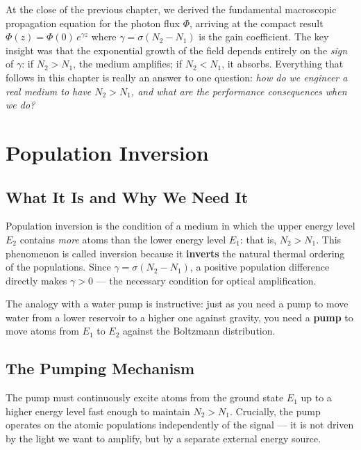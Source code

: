 
At the close of the previous chapter, we derived the fundamental macroscopic propagation equation for the photon flux $\Phi$, arriving at the compact result $\Phi(z) = \Phi(0)\,e^{\gamma z}$ where $\gamma = \sigma(N_2 - N_1)$ is the gain coefficient. The key insight was that the exponential growth of the field depends entirely on the \emph{sign} of $\gamma$: if $N_2 > N_1$, the medium amplifies; if $N_2 < N_1$, it absorbs. Everything that follows in this chapter is really an answer to one question: \emph{how do we engineer a real medium to have $N_2 > N_1$, and what are the performance consequences when we do?}

\section{Population Inversion}

\subsection{What It Is and Why We Need It}

Population inversion is the condition of a medium in which the upper energy level $E_2$ contains \emph{more} atoms than the lower energy level $E_1$: that is, $N_2 > N_1$. This phenomenon is called inversion because it \textbf{inverts} the natural thermal ordering of the populations. Since $\gamma = \sigma(N_2 - N_1)$, a positive population difference directly makes $\gamma > 0$ — the necessary condition for optical amplification.

The analogy with a water pump is instructive: just as you need a pump to move water from a lower reservoir to a higher one against gravity, you need a \textbf{pump} to move atoms from $E_1$ to $E_2$ against the Boltzmann distribution.

\subsection{The Pumping Mechanism}

The pump must continuously excite atoms from the ground state $E_1$ up to a higher energy level fast enough to maintain $N_2 > N_1$. Crucially, the pump operates on the atomic populations independently of the signal — it is not driven by the light we want to amplify, but by a separate external energy source.

